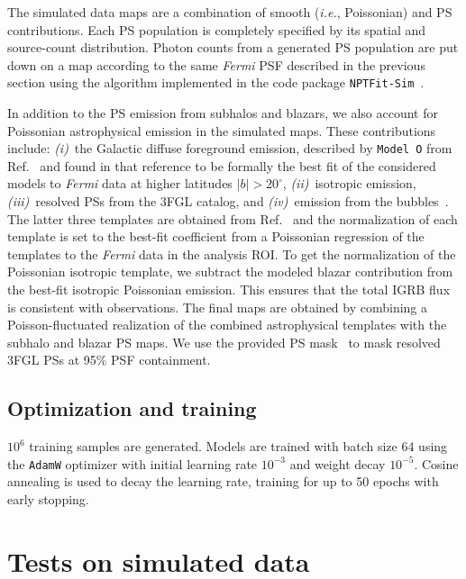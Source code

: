 \documentclass[prd,aps,10pt,nofootinbib,twocolumn,superscriptaddress,preprintnumbers,balancelastpage,longbibliography]{revtex4-1}
\begin{document}
The simulated data maps are a combination of smooth (\emph{i.e.}, Poissonian) and PS contributions. Each PS population is completely specified by its spatial and source-count distribution. Photon counts from a generated PS population are put down on a map according to the same \emph{Fermi} PSF described in the previous section using the algorithm implemented in the code package \texttt{NPTFit-Sim}~\cite{NPTFit-Sim}.

In addition to the PS emission from subhalos and blazars, we also account for Poissonian astrophysical emission in the simulated maps.  These contributions include: \emph{(i)}~the Galactic diffuse foreground emission, described by \texttt{Model~O} from Ref.~\cite{Buschmann:2020adf} and found in that reference to be formally the best fit of the considered models to \emph{Fermi} data at higher latitudes $|b|>20^\circ$, \emph{(ii)}~isotropic emission, \emph{(iii)}~resolved PSs from the 3FGL catalog, and \emph{(iv)}~emission from the \Fermi bubbles~\cite{Su:2010qj}. The latter three templates are obtained from Ref.~\cite{rodd_nicholas_safdi_siddharth_2016} and the normalization of each template is set to the best-fit coefficient from a Poissonian regression of the templates to the \emph{Fermi} data in the analysis ROI. To get the normalization of the Poissonian isotropic template, we subtract the modeled blazar contribution from the best-fit isotropic Poissonian emission. This ensures that the total IGRB flux is consistent with observations. The final maps are obtained by combining a Poisson-fluctuated realization of the combined astrophysical templates with the subhalo and blazar PS maps. We use the provided PS mask~\cite{rodd_nicholas_safdi_siddharth_2016} to mask resolved 3FGL PSs at 95\% PSF containment.   

\subsection{Optimization and training}

$10^{6}$ training samples are generated. Models are trained with batch size 64 using the \texttt{AdamW} optimizer with initial learning rate $10^{-3}$ and weight decay $10^{-5}$. Cosine annealing is used to decay the learning rate, training for up to 50 epochs with early stopping.

\section{Tests on simulated data}
\label{sec:simulations}
\end{document}
